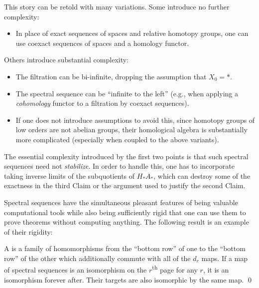 \begin{remark}
This story can be retold with many variations.
Some introduce no further complexity:
\begin{itemize}
    \item In place of exact sequences of spaces and relative homotopy groups, one can use coexact sequences of spaces and a homology functor.
\end{itemize}
Others introduce substantial complexity:
\begin{itemize}
    \item The filtration can be bi-infinite, dropping the assumption that $X_0 = *$.
    \item The spectral sequence can be ``infinite to the left'' (e.g., when applying a \emph{cohomology} functor to a filtration by coexact sequences).
    \item If one does not introduce assumptions to avoid this, since homotopy groups of low orders are not abelian groups, their homological algebra is substantially more complicated (especially when coupled to the above variants).
\end{itemize}
The essential complexity introduced by the first two points is that such spectral sequences need not \emph{stabilize}.
In order to handle this, one has to incorporate taking inverse limits of the subquotients of $H_* A_*$, which can destroy some of the exactness in the third Claim or the argument used to justify the second Claim.
\end{remark}

Spectral sequences have the simultaneous pleasant features of being valuable computational tools while also being sufficiently rigid that one can use them to prove theorems without computing anything.
The following result is an example of their rigidity:

\begin{lemma}
A  is a family of homomorphisms from the ``bottom row'' of one to the ``bottom row'' of the other which additionally commute with all of the $d_r$ maps.
If a map of spectral sequences is an isomorphism on the $r$\textsuperscript{th} page for any $r$, it is an isomorphism forever after.
Their targets are also isomorphic by the same map. \qed
\end{lemma}

